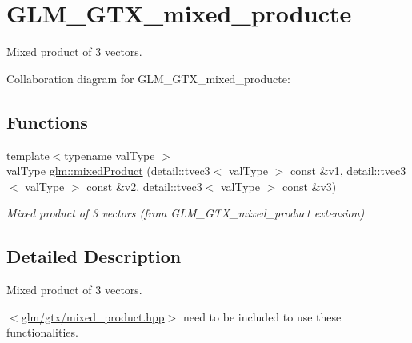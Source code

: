\hypertarget{group__gtx__mixed__product}{}\section{G\+L\+M\+\_\+\+G\+T\+X\+\_\+mixed\+\_\+producte}
\label{group__gtx__mixed__product}


Mixed product of 3 vectors.  


Collaboration diagram for G\+L\+M\+\_\+\+G\+T\+X\+\_\+mixed\+\_\+producte\+:
\subsection*{Functions}
\begin{DoxyCompactItemize}
\item 
\hypertarget{group__gtx__mixed__product_ga467ea3206326ea2887561ce44a8a24b6}{}{\footnotesize template$<$typename val\+Type $>$ }\\val\+Type \hyperlink{group__gtx__mixed__product_ga467ea3206326ea2887561ce44a8a24b6}{glm\+::mixed\+Product} (detail\+::tvec3$<$ val\+Type $>$ const \&v1, detail\+::tvec3$<$ val\+Type $>$ const \&v2, detail\+::tvec3$<$ val\+Type $>$ const \&v3)\label{group__gtx__mixed__product_ga467ea3206326ea2887561ce44a8a24b6}

\begin{DoxyCompactList}\small\item\em Mixed product of 3 vectors (from G\+L\+M\+\_\+\+G\+T\+X\+\_\+mixed\+\_\+product extension) \end{DoxyCompactList}\end{DoxyCompactItemize}


\subsection{Detailed Description}
Mixed product of 3 vectors. 

$<$\hyperlink{mixed__product_8hpp}{glm/gtx/mixed\+\_\+product.\+hpp}$>$ need to be included to use these functionalities. 